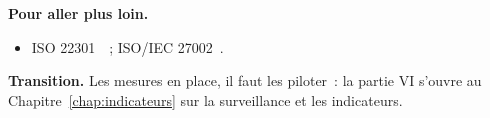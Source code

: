 \bigskip

\begin{boxinfo}
\textbf{Pour aller plus loin.}
\begin{itemize}
    \item ISO 22301~\cite{iso22301}~; ISO/IEC 27002~\cite{iso27002}.
\end{itemize}
\end{boxinfo}

\begin{boxinfo}
\textbf{Transition.} Les mesures en place, il faut les piloter~: la partie VI
s'ouvre au Chapitre~\ref{chap:indicateurs} sur la surveillance et les
indicateurs.
\end{boxinfo}
